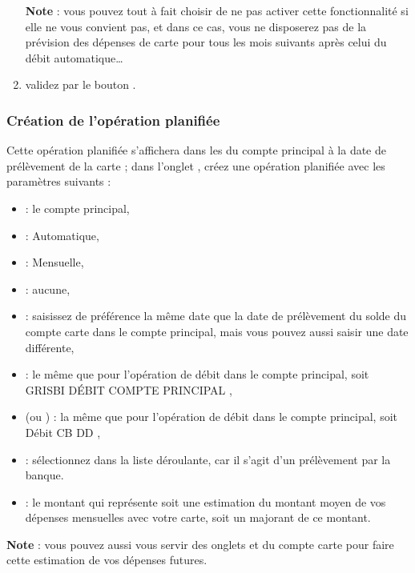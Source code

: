 \begin{enumerate}
	\textbf{Note} : vous pouvez tout à fait choisir de ne pas activer cette fonctionnalité si elle ne vous convient pas, et dans ce cas, vous ne disposerez pas de la prévision des dépenses de carte pour tous les mois suivants après celui du débit automatique\ldots						 
	\item  validez par le bouton .					
\end{enumerate}			  


\subsubsection{Création de l'opération planifiée}

Cette opération planifiée s'affichera dans les  du compte principal à la date de prélèvement de la carte ; dans l'onglet , créez une opération planifiée avec les paramètres suivants :

\begin{itemize}
	 \item {} : le compte principal,		
	 \item {} : Automatique,
	 \item {} : Mensuelle,
	 \item {} : aucune,	 
	 \item {} : saisissez de préférence la même date que la date de prélèvement du solde du compte carte dans le compte principal, mais vous pouvez aussi saisir une date différente,
	 \item {} : le même que pour l'opération de débit dans le compte principal, soit \og GRISBI DÉBIT COMPTE PRINCIPAL \fg{},
	 \item {} (ou ) : la même que pour l'opération de débit dans le compte principal, soit \og Débit CB DD \fg{},
	 \item {} : sélectionnez  dans la liste déroulante, car il s'agit d'un prélèvement par la banque.	
	 \item {} : le montant qui représente soit une estimation du montant moyen de vos dépenses mensuelles avec votre carte, soit un majorant de ce montant.
\end{itemize}	

	\textbf{Note} : vous pouvez aussi vous servir des onglets  et  du compte carte pour faire cette estimation de vos dépenses futures.

